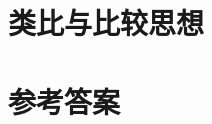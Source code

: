 \section{类比与比较思想}

%
\stopexercise

\newpage
\section{参考答案}
\begin{multicols}{2}
  \printanswer
\end{multicols}
